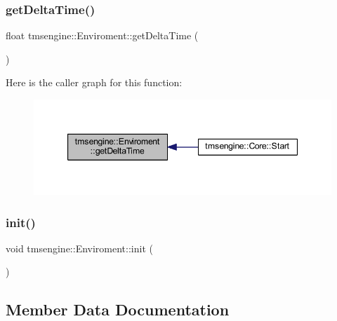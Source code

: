 \subsubsection{\texorpdfstring{get\+Delta\+Time()}{getDeltaTime()}}
{\footnotesize\ttfamily float tmsengine\+::\+Enviroment\+::get\+Delta\+Time (\begin{DoxyParamCaption}{ }\end{DoxyParamCaption})}

Here is the caller graph for this function\+:\nopagebreak
\begin{figure}[H]
\begin{center}
\leavevmode
\includegraphics[width=347pt]{classtmsengine_1_1_enviroment_aaa6d260aca99eb32d5ee96771fe34a01_icgraph}
\end{center}
\end{figure}
\mbox{\label{classtmsengine_1_1_enviroment_ae82cd04e139ac869bdb6a1b41a28c830}} 
\subsubsection{\texorpdfstring{init()}{init()}}
{\footnotesize\ttfamily void tmsengine\+::\+Enviroment\+::init (\begin{DoxyParamCaption}{ }\end{DoxyParamCaption})}



\subsection{Member Data Documentation}
\mbox{\label{classtmsengine_1_1_enviroment_a6481f99308483a38e2a130f775767dd3}} 
